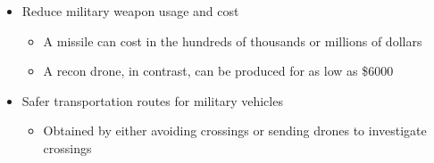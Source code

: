 \documentclass{article}
\begin{document}
	\begin{itemize}
		\item Reduce military weapon usage and cost
		\begin{itemize}
			\item A missile can cost in the hundreds of thousands or millions of dollars
			\item A recon drone, in contrast, can be produced for as low as \$6000
		\end{itemize}
		\item Safer transportation routes for military vehicles
			\begin{itemize}
				\item Obtained by either avoiding crossings or sending drones to investigate crossings
			\end{itemize}
		\end{itemize}
		

	
\end{document}
